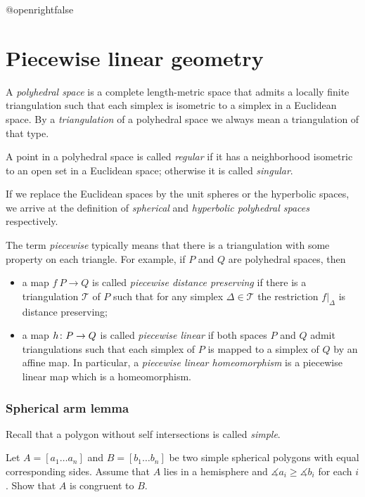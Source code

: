 \csname @openrightfalse\endcsname
\chapter{Piecewise linear geometry}


A \emph{polyhedral space} is a complete length-metric space that admits a locally finite triangulation 
such that each simplex is isometric to a simplex in a Euclidean space.
By a {}\emph{triangulation} of a polyhedral space we always mean a triangulation of that type. 

A point in a polyhedral space is called \emph{regular} if it has a neighborhood isometric to an open set in a Euclidean space;
otherwise it is called {}\emph{singular}.

If we replace the Euclidean spaces by the unit spheres or the hyperbolic spaces,
we arrive at the definition of {}\emph{spherical} and {}\emph{hyperbolic polyhedral spaces} respectively.

The term \emph{piecewise} typically means that there is a triangulation with some property on each triangle.
For example,  if $P$ and $Q$ are polyhedral spaces, then
\begin{itemize}
\item a map $f\:P\to Q$ is called {}\emph{piecewise distance preserving} if there is a triangulation $\mathcal{T}$ of $P$ such that for any simplex $\Delta\in \mathcal{T}$ the restriction $f|_\Delta$ is distance preserving;
\item a map $h\:P\z\to Q$  is called {}\emph{piecewise linear} if both spaces $P$ and $Q$ admit triangulations such that each simplex of $P$ is mapped to a simplex of $Q$ by an affine map.
In particular, a {}\emph{piecewise linear homeomorphism} is a piecewise linear map which is a homeomorphism.\label{piecewise linear map}
\end{itemize}





\subsection*{Spherical arm lemma}\label{Spherical arm lemma}

Recall that a polygon without self intersections is called \emph{simple}.

\begin{pr}
Let $A=[a_1\dots a_n]$ and $B=[b_1\dots b_n]$ be two simple spherical polygons 
with equal corresponding sides.
Assume that $A$ lies in a hemisphere and $\measuredangle a_i\ge\measuredangle b_i$ for each $i$.
Show that $A$ is congruent to $B$.
\end{pr}


